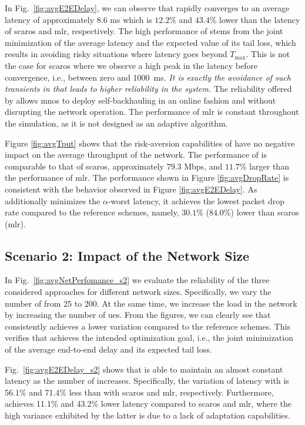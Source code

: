 In Fig.~\ref{fig:avgE2EDelay}, we can observe that \name{} rapidly converges to an average latency of approximately $8.6$ ms which is $12.2$\% and $43.4$\% lower than the latency of \gls{scaros} and \gls{mlr}, respectively. The high performance of \name{} stems from the joint minimization of the average latency and the expected value of its tail loss, which results in avoiding risky situations where latency goes beyond $T_\mathrm{max}$.
This is not the case for \gls{scaros} where we observe a high peak in the latency before convergence, i.e., between zero and 1000~ms. \textit{It is exactly the avoidance of such transients in \name{} that leads to higher reliability in the system.} The reliability offered by \name{} allows \glspl{mno} to deploy self-backhauling in an online fashion and without disrupting the network operation. The performance of \gls{mlr} is constant throughout the simulation, as it is not designed as an adaptive algorithm.


Figure \ref{fig:avgTput} shows that the risk-aversion capabilities of \name{} have no negative impact on the average throughput of the network. 
The performance of \name{} is comparable to that of \gls{scaros}, approximately $79.3$ Mbps, and $11.7$\% larger than the performance of \gls{mlr}.
The performance shown in Figure \ref{fig:avgDropRate} is consistent with the behavior observed in Figure \ref{fig:avgE2EDelay}. As \name{} additionally minimizes the $\alpha$-worst latency, it achieves the lowest packet drop rate compared to the reference schemes, namely, $30.1$\% ($84.0$\%) lower than \gls{scaros} (\gls{mlr}).


\subsection{Scenario 2: Impact of the Network Size}
\label{sub:netSize}
In Fig.~\ref{fig:avgNetPerfomance_s2} we evaluate the reliability of the three considered approaches for different network sizes. Specifically, we vary the number of \nodes{} from 25 to 200.  At the same time, we increase the load in the network by increasing the number of \gls{ue}s.
From the figures, we can clearly see that \name{} consistently achieves a lower variation compared to the reference schemes. This verifies that \name{} achieves the intended optimization goal, i.e., the joint minimization of the average end-to-end delay and its expected tail loss.

Fig.~\ref{fig:avgE2EDelay_s2} shows that \name{} is able to maintain an almost constant latency as the number of \nodes{} increases. Specifically, the variation of latency with \name{} is  56.1\% and 71.4\% less than with \gls{scaros} and \gls{mlr}, respectively. Furthermore, \name{} achieves 11.1\% and 43.2\% lower latency compared to \gls{scaros} and \gls{mlr}, where the high variance exhibited by the latter is due to a lack of adaptation capabilities. 

